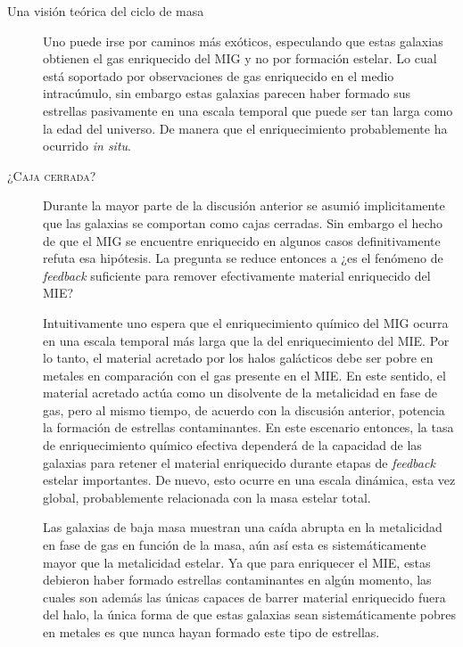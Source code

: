 \documentclass[xcolor=dvipsnames,4pt,hyperref={colorlinks,citecolor=black,linkcolor=black,urlcolor=black}]{beamer}
\begin{document}
\begin{frame}[allowframebreaks]{Una visión teórica del ciclo de masa}
\begin{description}
Uno puede irse por caminos más exóticos, especulando que estas galaxias obtienen el gas enriquecido
del MIG y no por formación estelar. Lo cual está soportado por observaciones de gas enriquecido en
el medio intracúmulo, sin embargo estas galaxias parecen haber formado sus estrellas pasivamente en
una escala temporal que puede ser tan larga como la edad del universo. De manera que el
enriquecimiento probablemente ha ocurrido \emph{in situ}.
%
\item[\textsc{¿Caja cerrada?}] Durante la mayor parte de la discusión anterior se asumió
implicitamente que las galaxias se comportan como cajas cerradas. Sin embargo el hecho de que el MIG
se encuentre enriquecido en algunos casos definitivamente refuta esa hipótesis. La pregunta se
reduce entonces a ¿es el fenómeno de \emph{feedback} suficiente para remover efectivamente material
enriquecido del MIE?

Intuitivamente uno espera que el enriquecimiento químico del MIG ocurra en una escala temporal más
larga que la del enriquecimiento del MIE. Por lo tanto, el material acretado por los halos
galácticos debe ser pobre en metales en comparación con el gas presente en el MIE. En este sentido,
el material acretado actúa como un disolvente de la metalicidad en fase de gas, pero al mismo
tiempo, de acuerdo con la discusión anterior, potencia la formación de estrellas contaminantes. En
este escenario entonces, la tasa de enriquecimiento químico efectiva dependerá de la capacidad de
las galaxias para retener el material enriquecido durante etapas de \emph{feedback} estelar
importantes. De nuevo, esto ocurre en una escala dinámica, esta vez global, probablemente
relacionada con la masa estelar total.

Las galaxias de baja masa muestran una caída abrupta en la metalicidad en fase de gas en función de
la masa, aún así esta es sistemáticamente mayor que la metalicidad estelar. Ya que para enriquecer
el MIE, estas debieron haber formado estrellas contaminantes en algún momento, las cuales son además
las únicas capaces de barrer material enriquecido fuera del halo, la única forma de que estas
galaxias sean sistemáticamente pobres en metales es que nunca hayan formado este tipo de estrellas.
%
\end{description}
\end{frame}
\end{document}
